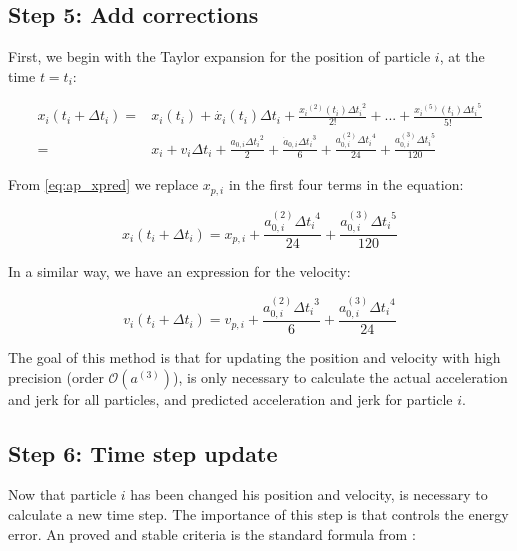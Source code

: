 \begin{appendixs}
	
	\subsection{Step 5: Add corrections}
	
	First, we begin with the Taylor expansion for the position of particle $i$, at the time $t = t_i$:
	
	\begin{align}
		x_i(t_i + \Delta t_i) =& x_i(t_i) + \dot{x_i}(t_i)\Delta t_i + \frac{{x_i}^{(2)}(t_i){\Delta t_i}^2}{2!} + ... + \frac{{x_i}^{(5)}(t_i){\Delta t_i}^5}{5!}\\
		=& x_i + v_i \Delta t_i + \frac{a_{0, i} {\Delta t_i}^2}{2} + \frac{\dot{a}_{0, i} {\Delta t_i}^3}{6} + \frac{a^{(2)}_{0, i} {\Delta t_i}^4}{24} + \frac{a^{(3)}_{0, i} {\Delta t_i}^5}{120}
	\end{align}
	
	From \eqref{eq:ap_xpred} we replace $x_{p, i}$ in the first four terms in the equation:
	
	\begin{equation}
		x_i(t_i + \Delta t_i) = x_{p, i} + \frac{a^{(2)}_{0, i} {\Delta t_i}^4}{24} + \frac{a^{(3)}_{0, i} {\Delta t_i}^5}{120} \label{eq:ap_xcorr}
	\end{equation}
	
	In a similar way, we have an expression for the velocity:
	
	\begin{equation}
		v_i(t_i + \Delta t_i) = v_{p, i} + \frac{a^{(2)}_{0, i} {\Delta t_i}^3}{6} + \frac{a^{(3)}_{0, i} {\Delta t_i}^4}{24} \label{eq:ap_vcorr}
	\end{equation}
	
	The goal of this method is that for updating the position and velocity with high precision (order $\mathcal{O}(a^{(3)})$), is only necessary to calculate the actual acceleration and jerk for all particles, and predicted acceleration and jerk for particle $i$.
	
	\subsection{Step 6: Time step update}
	
	Now that particle $i$ has been changed his position and velocity, is necessary to calculate a new time step. The importance of this step is that controls the energy error. An proved and stable criteria is the standard formula from \cite{aarseth1985}:
	

\end{appendixs}
